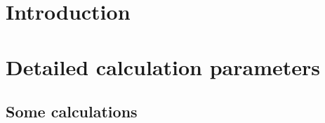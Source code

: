 \documentclass[10pt,a4paper]{article}
\title{Supplementary Information: $TITLE}
\author{$AUTHORS}
\begin{document}
\maketitle

\section{Introduction}

\section{Detailed calculation parameters}

\subsection{Some calculations}

\end{document}
